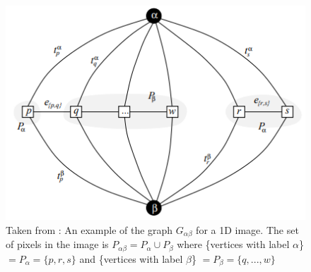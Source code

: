 \documentclass{kththesis}
\begin{document}
\begin{figure}[H]
    \centering
    \includegraphics[width = \textwidth]{images/abgraph.png}
    \caption{Taken from \parencite{BoykovEnergyMinim}: An example of the graph $G_{\alpha\beta}$ for a 1D image.
The set of pixels in the image is $P_{\alpha\beta} = P_\alpha \cup P_\beta$  where 
\{vertices with label $\alpha$\} $=P_\alpha = \{p, r, s\}$ and \{vertices with label $\beta$\} $=P_\beta = \{q,..., w\}$}
    \label{fig:graphCut}
\end{figure}
\end{document}
